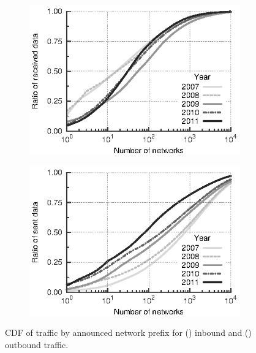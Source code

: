 \begin{figure}[t]
    \begin{subfigure}[b]{0.5\linewidth}
        \centering
        \includegraphics[width=0.95\linewidth]{figures/inflex/ecdf_network_dst_data_bytes_from_10000.eps}
        \caption{\label{prefix_in}}
    \end{subfigure}%
    \begin{subfigure}[b]{0.5\linewidth}
        \centering
        \includegraphics[width=0.95\linewidth]{figures/inflex/ecdf_network_dst_data_bytes_to_10000.eps}
        \caption{\label{prefix_out}}
    \end{subfigure}%
    \caption[\acs{CDF} of traffic by announced network prefix.]{\acs{CDF} of traffic by announced network prefix for () inbound and () outbound traffic.\label{fig:prefix}}
    \hfill
\end{figure}

